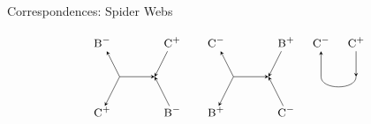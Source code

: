 \documentclass{beamer}
\begin{document}
\begin{frame}{Correspondences: Spider Webs}
\begin{figure}[h!]
\[\begin{tikzpicture}
			\node (i32) at (3.75,-6) {$\textsc{\small B}^-$};
			\node (ii32) at (5.75,-6) {$\textsc{\small C}^+$};
			\node (d32) at (4.25,-7) {};
			\node (dd32) at (5.25,-7) {};
			\node (o32) at (3.75,-8) {$\textsc{\small C}^+$};
			\node (oo32) at (5.75,-8) {$\textsc{\small B}^-$};
			\draw[<-,>=stealth] (i32) -- (d32.center);
			\draw[->,>=stealth] (ii32) -- (dd32.center);
			\draw[->,>=stealth] (d32.center) -- (dd32.center);
			\draw[->,>=stealth, shorten >=5pt] (d32.center) -- (o32.center);
			\draw[<-,>=stealth, shorten >=5pt] (dd32.center) -- (oo32.center);
			
			\node (i33) at (7,-6) {$\textsc{\small C}^-$};
			\node (ii33) at (9,-6) {$\textsc{\small B}^+$};
			\node (d33) at (7.5,-7) {};
			\node (dd33) at (8.5,-7) {};
			\node (o33) at (7,-8) {$\textsc{\small B}^+$};
			\node (oo33) at (9,-8) {$\textsc{\small C}^-$};
			\draw[<-,>=stealth] (i33) -- (d33.center);
			\draw[->,>=stealth] (ii33) -- (dd33.center);
			\draw[->,>=stealth] (d33.center) -- (dd33.center);
			\draw[->,>=stealth, shorten >=5pt] (d33.center) -- (o33.center);
			\draw[<-,>=stealth, shorten >=5pt] (dd33.center) -- (oo33.center);
			
			\node (i34) at (10,-6) {$\textsc{\small C}^-$};
			\node (ii34) at (11,-6) {$\textsc{\small C}^+$};
			\node (d34) at (10,-7) {};
			\node (dd34) at (11,-7) {};
			\draw[<-,>=stealth] (i34) -- (d34.center);
			\draw[->,>=stealth] (ii34) -- (dd34.center);
			\draw (d34.center) edge [-,>=stealth,bend right=90] (dd34.center);
			
			\end{tikzpicture}
			\]
			\end{figure}
	\end{frame}
  	
\end{document}
